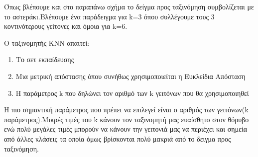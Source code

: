 Όπως βλέπουμε και στο παραπάνω σχήμα το δείγμα προς ταξινόμηση συμβολίζεται με το αστεράκι.Βλέπουμε ένα παράδειγμα για k=3 όπου συλλέγουμε τους 3 κοντινότερους γείτονες και όμοια για k=6.

Ο ταξινομητής ΚΝΝ απαιτεί:
\begin{enumerate}
	\item Το σετ εκπαίδευσης
	\item Μια μετρική απόστασης όπου συνήθως χρησιμοποιείται η Ευκλείδια Απόσταση
	\item Η παράμετρος k που δηλώνει τον αριθμό των k γειτόνων που θα χρησιμοποιηθεί
\end{enumerate}

Η πιο σημαντική παράμετρος που πρέπει να επιλεγεί είναι ο αριθμός των γειτόνων(k παράμετρος).Μικρές τιμές του k κάνουν τον ταξινομητή μας ευαίσθητο στον θόρυβο ενώ πολύ μεγάλες τιμές μπορούν να κάνουν την γειτονιά μας να περιέχει και σημεία από άλλες κλάσεις τα οποία όμως βρίσκονται πολύ μακριά από το δειγμα προς ταξινόμηση.
